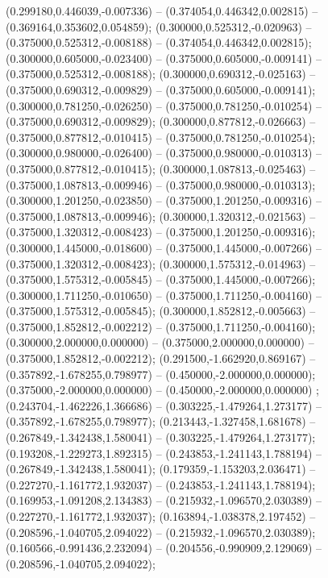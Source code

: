  (0.299180,0.446039,-0.007336) -- (0.374054,0.446342,0.002815) -- (0.369164,0.353602,0.054859);
 (0.300000,0.525312,-0.020963) -- (0.375000,0.525312,-0.008188) -- (0.374054,0.446342,0.002815);
 (0.300000,0.605000,-0.023400) -- (0.375000,0.605000,-0.009141) -- (0.375000,0.525312,-0.008188);
 (0.300000,0.690312,-0.025163) -- (0.375000,0.690312,-0.009829) -- (0.375000,0.605000,-0.009141);
 (0.300000,0.781250,-0.026250) -- (0.375000,0.781250,-0.010254) -- (0.375000,0.690312,-0.009829);
 (0.300000,0.877812,-0.026663) -- (0.375000,0.877812,-0.010415) -- (0.375000,0.781250,-0.010254);
 (0.300000,0.980000,-0.026400) -- (0.375000,0.980000,-0.010313) -- (0.375000,0.877812,-0.010415);
 (0.300000,1.087813,-0.025463) -- (0.375000,1.087813,-0.009946) -- (0.375000,0.980000,-0.010313);
 (0.300000,1.201250,-0.023850) -- (0.375000,1.201250,-0.009316) -- (0.375000,1.087813,-0.009946);
 (0.300000,1.320312,-0.021563) -- (0.375000,1.320312,-0.008423) -- (0.375000,1.201250,-0.009316);
 (0.300000,1.445000,-0.018600) -- (0.375000,1.445000,-0.007266) -- (0.375000,1.320312,-0.008423);
 (0.300000,1.575312,-0.014963) -- (0.375000,1.575312,-0.005845) -- (0.375000,1.445000,-0.007266);
 (0.300000,1.711250,-0.010650) -- (0.375000,1.711250,-0.004160) -- (0.375000,1.575312,-0.005845);
 (0.300000,1.852812,-0.005663) -- (0.375000,1.852812,-0.002212) -- (0.375000,1.711250,-0.004160);
 (0.300000,2.000000,0.000000) -- (0.375000,2.000000,0.000000) -- (0.375000,1.852812,-0.002212);
 (0.291500,-1.662920,0.869167) -- (0.357892,-1.678255,0.798977) -- (0.450000,-2.000000,0.000000);
 (0.375000,-2.000000,0.000000) -- (0.450000,-2.000000,0.000000) ;
 (0.243704,-1.462226,1.366686) -- (0.303225,-1.479264,1.273177) -- (0.357892,-1.678255,0.798977);
 (0.213443,-1.327458,1.681678) -- (0.267849,-1.342438,1.580041) -- (0.303225,-1.479264,1.273177);
 (0.193208,-1.229273,1.892315) -- (0.243853,-1.241143,1.788194) -- (0.267849,-1.342438,1.580041);
 (0.179359,-1.153203,2.036471) -- (0.227270,-1.161772,1.932037) -- (0.243853,-1.241143,1.788194);
 (0.169953,-1.091208,2.134383) -- (0.215932,-1.096570,2.030389) -- (0.227270,-1.161772,1.932037);
 (0.163894,-1.038378,2.197452) -- (0.208596,-1.040705,2.094022) -- (0.215932,-1.096570,2.030389);
 (0.160566,-0.991436,2.232094) -- (0.204556,-0.990909,2.129069) -- (0.208596,-1.040705,2.094022);
